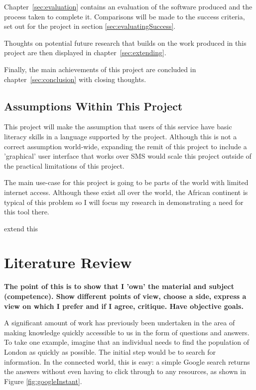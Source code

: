 \documentclass[authoryearcitations]{UoYCSproject}
\begin{document}
Chapter~\ref{sec:evaluation} contains an evaluation of the software produced and the process taken to complete it.  Comparisons will be made to the success criteria, set out for the project in section \ref{sec:evaluatingSuccess}.

Thoughts on potential future research that builds on the work produced in this project are then displayed in chapter~\ref{sec:extending}.

Finally, the main achievements of this project are concluded in chapter~\ref{sec:conclusion} with closing thoughts.


\section{Assumptions Within This Project}
This project will make the assumption that users of this service have basic literacy skills in a language supported by the project.  Although this is not a correct assumption world-wide, expanding the remit of this project to include a 'graphical' user interface that works over SMS would scale this project outside of the practical limitations of this project.

The main use-case for this project is going to be parts of the world with limited internet access.  Although these exist all over the world, the African continent is typical of this problem so I will focus my research in demonstrating a need for this tool there.

{\color{red} extend this}

\newpage

\chapter{Literature Review}
\label{sec:literatureReview}

{\bf The point of this is to show that I 'own' the material and subject (competence).  Show different points of view, choose a side, express a view on which I prefer and if I agree, critique.  Have objective goals.}

A significant amount of work has previously been undertaken in the area of making knowledge quickly accessible to us in the form of questions and answers.  To take one example, imagine that an individual needs to find the population of London as quickly as possible.  The initial step would be to search for information.  In the connected world, this is easy: a simple Google search returns the answers without even having to click through to any resources, as shown in Figure \ref{fig:googleInstant}.
\end{document}

